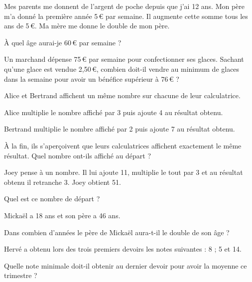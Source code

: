 \begin{exercice}
Mes parents me donnent de l'argent de poche depuis que j'ai 12 ans. Mon père m'a donné la première année 5\,€ par semaine. Il augmente cette somme tous les ans de 5\,€. Ma mère me donne le double de mon père.

À quel âge aurai-je 60\,€ par semaine ?
\end{exercice}

\begin{exercice}
Un marchand dépense 75\,€ par semaine pour confectionner ses glaces. Sachant qu'une glace est vendue 2,50\,€, combien doit-il vendre au minimum de glaces dans la semaine pour avoir un bénéfice supérieur à 76\,€ ?
\end{exercice}




\begin{exercice}
Alice et Bertrand affichent un même nombre sur chacune de leur calculatrice. 
\begin{cadre}
Alice multiplie le nombre affiché par 3 puis ajoute 4 au résultat obtenu.
\end{cadre}
\begin{cadre}
Bertrand multiplie le nombre affiché par 2 puis ajoute 7 au résultat obtenu.
\end{cadre}
 
À la fin, ils s'aperçoivent que leurs calculatrices affichent exactement le même résultat. Quel nombre ont-ils affiché au départ ? 
\end{exercice}




\begin{exercice}
Joey pense à un nombre. Il lui ajoute 11, multiplie le tout par 3 et au résultat obtenu il retranche 3. Joey obtient 51.

Quel est ce nombre de départ ?
\end{exercice}




\begin{exercice}
Mickaël a 18 ans et son père a 46 ans.

Dans combien d'années le père de Mickaël aura-t-il le double de son âge ?
\end{exercice}



\begin{exercice}
Hervé a obtenu lors des trois premiers devoirs les notes suivantes : 8 ; 5 et 14.

Quelle note minimale doit-il obtenir au dernier devoir pour avoir la moyenne ce trimestre ?
\end{exercice}



